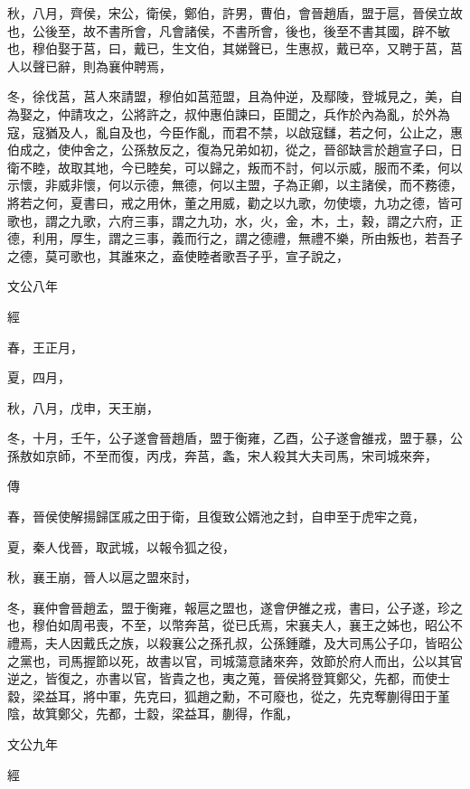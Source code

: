 \documentclass{ctexart}
\begin{document}
秋，八月，齊侯，宋公，衛侯，鄭伯，許男，曹伯，會晉趙盾，盟于扈，晉侯立故也，公後至，故不書所會，凡會諸侯，不書所會，後也，後至不書其國，辟不敏也，穆伯娶于莒，曰，戴已，生文伯，其娣聲已，生惠叔，戴已卒，又聘于莒，莒人以聲已辭，則為襄仲聘焉，

冬，徐伐莒，莒人來請盟，穆伯如莒蒞盟，且為仲逆，及鄢陵，登城見之，美，自為娶之，仲請攻之，公將許之，叔仲惠伯諫曰，臣聞之，兵作於內為亂，於外為寇，寇猶及人，亂自及也，今臣作亂，而君不禁，以啟寇讎，若之何，公止之，惠伯成之，使仲舍之，公孫敖反之，復為兄弟如初，從之，晉郤缺言於趙宣子曰，日衛不睦，故取其地，今已睦矣，可以歸之，叛而不討，何以示威，服而不柔，何以示懷，非威非懷，何以示德，無德，何以主盟，子為正卿，以主諸侯，而不務德，將若之何，夏書曰，戒之用休，董之用威，勸之以九歌，勿使壞，九功之德，皆可歌也，謂之九歌，六府三事，謂之九功，水，火，金，木，土，穀，謂之六府，正德，利用，厚生，謂之三事，義而行之，謂之德禮，無禮不樂，所由叛也，若吾子之德，莫可歌也，其誰來之，盍使睦者歌吾子乎，宣子說之，





文公八年


經



春，王正月，

夏，四月，

秋，八月，戊申，天王崩，

冬，十月，壬午，公子遂會晉趙盾，盟于衡雍，乙酉，公子遂會雒戎，盟于暴，公孫敖如京師，不至而復，丙戌，奔莒，螽，宋人殺其大夫司馬，宋司城來奔，

傳



春，晉侯使解揚歸匡戚之田于衛，且復致公婿池之封，自申至于虎牢之竟，

夏，秦人伐晉，取武城，以報令狐之役，

秋，襄王崩，晉人以扈之盟來討，

冬，襄仲會晉趙孟，盟于衡雍，報扈之盟也，遂會伊雒之戎，書曰，公子遂，珍之也，穆伯如周弔喪，不至，以幣奔莒，從已氏焉，宋襄夫人，襄王之姊也，昭公不禮焉，夫人因戴氏之族，以殺襄公之孫孔叔，公孫鍾離，及大司馬公子卬，皆昭公之黨也，司馬握節以死，故書以官，司城蕩意諸來奔，效節於府人而出，公以其官逆之，皆復之，亦書以官，皆貴之也，夷之蒐，晉侯將登箕鄭父，先都，而使士縠，梁益耳，將中軍，先克曰，狐趙之勳，不可廢也，從之，先克奪蒯得田于堇陰，故箕鄭父，先都，士縠，梁益耳，蒯得，作亂，





文公九年


經
\end{document}
